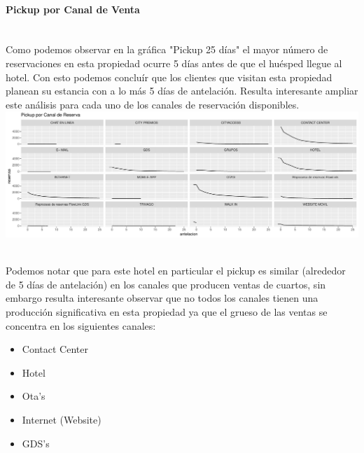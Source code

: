 \documentclass{article}\usepackage[]{graphicx}\usepackage[]{color}
\makeatletter
\def\maxwidth{ %
  \ifdim\Gin@nat@width>\linewidth
    \linewidth
  \else
    \Gin@nat@width
  \fi
}
\newenvironment{knitrout}{}{} %
\makeatother
\begin{document}
\paragraph{Pickup por Canal de Venta} ~\\
Como podemos observar en la gráfica "Pickup 25 días" el mayor número de reservaciones en esta propiedad ocurre 5 días antes de que el huésped llegue al hotel. Con esto podemos concluír que los clientes que visitan esta propiedad planean su estancia con a lo más 5 días de antelación. 
Resulta interesante ampliar este análisis para cada uno de los canales de reservación disponibles.
~\\
\begin{knitrout}
\color{fgcolor}
\includegraphics[width=\maxwidth]{figures/pickupsrc-1} 

\end{knitrout}
~\\
Podemos notar que para este hotel en particular el pickup es similar (alrededor de 5 días de antelación) en los canales que producen ventas de cuartos, sin embargo resulta interesante observar que no todos los canales tienen una producción significativa en esta propiedad ya que el grueso de las ventas se concentra en los siguientes canales:
\begin{itemize}[noitemsep]
\item Contact Center
\item Hotel
\item Ota's
\item Internet (Website)
\item GDS's
\end{itemize}
\end{document}
